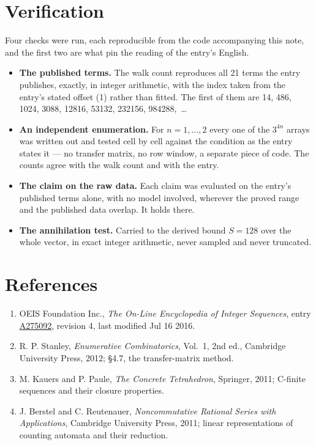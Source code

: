 \documentclass[11pt]{article}
\theoremstyle{definition}
\begin{document}
\section{Verification}

Four checks were run, each reproducible from the code accompanying this note, and the first two are what pin the reading of the entry's English.

\begin{itemize}

\item {\bfseries The published terms.} The walk count reproduces all 21 terms the entry publishes, exactly, in integer arithmetic, with the index taken from the entry's stated offset (1) rather than fitted. The first of them are 14, 486, 1024, 3088, 12816, 53132, 232156, 984288,~\dots

\item {\bfseries An independent enumeration.} For $n = 1,\dots,2$ every one of the $3^{4n}$ arrays was written out and tested cell by cell against the condition as the entry states it --- no transfer matrix, no row window, a separate piece of code. The counts agree with the walk count and with the entry.

\item {\bfseries The claim on the raw data.} Each claim was evaluated on the entry's published terms alone, with no model involved, wherever the proved range and the published data overlap. It holds there.

\item {\bfseries The annihilation test.} Carried to the derived bound $S = 128$ over the whole vector, in exact integer arithmetic, never sampled and never truncated.

\end{itemize}

\section{References}

\begin{enumerate}

\item OEIS Foundation Inc., \emph{The On-Line Encyclopedia of Integer Sequences}, entry \href{https://oeis.org/A275092}{A275092}, revision 4, last modified Jul 16 2016.

\item R. P. Stanley, \emph{Enumerative Combinatorics}, Vol.~1, 2nd ed., Cambridge University Press, 2012; \S4.7, the transfer-matrix method.

\item M. Kauers and P. Paule, \emph{The Concrete Tetrahedron}, Springer, 2011; C-finite sequences and their closure properties.

\item J. Berstel and C. Reutenauer, \emph{Noncommutative Rational Series with Applications}, Cambridge University Press, 2011; linear representations of counting automata and their reduction.

\end{enumerate}
\end{document}
